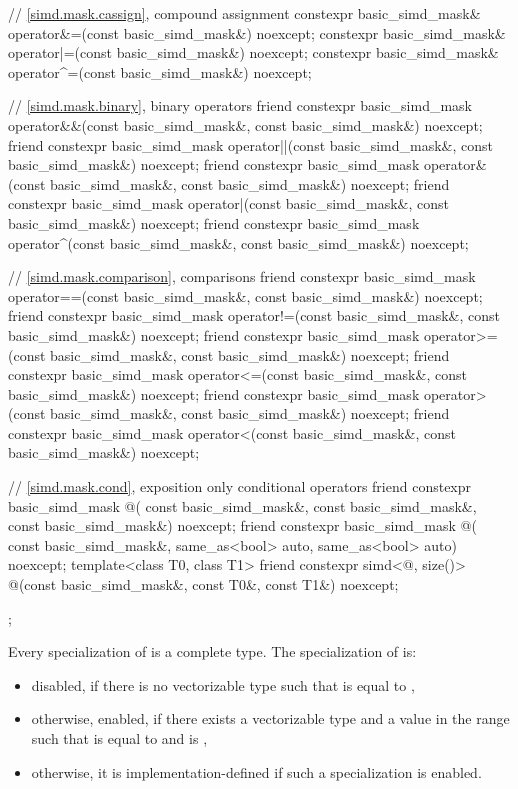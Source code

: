 \begin{codeblock}
{  // \ref{simd.mask.cassign},  compound assignment
  constexpr basic_simd_mask& operator&=(const basic_simd_mask&) noexcept;
  constexpr basic_simd_mask& operator|=(const basic_simd_mask&) noexcept;
  constexpr basic_simd_mask& operator^=(const basic_simd_mask&) noexcept;

  // \ref{simd.mask.binary},  binary operators
  friend constexpr basic_simd_mask
    operator&&(const basic_simd_mask&, const basic_simd_mask&) noexcept;
  friend constexpr basic_simd_mask
    operator||(const basic_simd_mask&, const basic_simd_mask&) noexcept;
  friend constexpr basic_simd_mask
    operator&(const basic_simd_mask&, const basic_simd_mask&) noexcept;
  friend constexpr basic_simd_mask
    operator|(const basic_simd_mask&, const basic_simd_mask&) noexcept;
  friend constexpr basic_simd_mask
    operator^(const basic_simd_mask&, const basic_simd_mask&) noexcept;

  // \ref{simd.mask.comparison},  comparisons
  friend constexpr basic_simd_mask
    operator==(const basic_simd_mask&, const basic_simd_mask&) noexcept;
  friend constexpr basic_simd_mask
    operator!=(const basic_simd_mask&, const basic_simd_mask&) noexcept;
  friend constexpr basic_simd_mask
    operator>=(const basic_simd_mask&, const basic_simd_mask&) noexcept;
  friend constexpr basic_simd_mask
    operator<=(const basic_simd_mask&, const basic_simd_mask&) noexcept;
  friend constexpr basic_simd_mask
    operator>(const basic_simd_mask&, const basic_simd_mask&) noexcept;
  friend constexpr basic_simd_mask
    operator<(const basic_simd_mask&, const basic_simd_mask&) noexcept;

  // \ref{simd.mask.cond},  exposition only conditional operators
  friend constexpr basic_simd_mask @\simdselect@(
    const basic_simd_mask&, const basic_simd_mask&, const basic_simd_mask&) noexcept;
  friend constexpr basic_simd_mask @\simdselect@(
    const basic_simd_mask&, same_as<bool> auto, same_as<bool> auto) noexcept;
  template<class T0, class T1>
    friend constexpr simd<@\seebelow@, size()>
      @\simdselect@(const basic_simd_mask&, const T0&, const T1&) noexcept;
};
\end{codeblock}

\pnum
Every specialization of  is a complete type.
The specialization of  is:
\begin{itemize}
  \item disabled, if there is no vectorizable type  such that  is
    equal to ,
  \item otherwise, enabled, if there exists a vectorizable type  and a value  in
    the range  such that  is equal to  and 
    is ,
  \item otherwise, it is implementation-defined if such a specialization is enabled.
\end{itemize}

